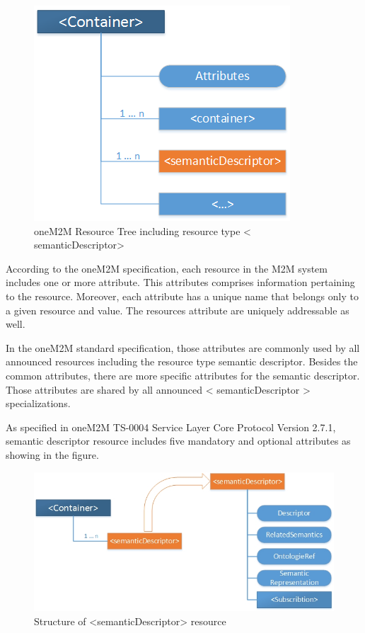 \begin{figure}[htbp]
    \centering
    \includegraphics[width=.5\textwidth]{resources/images/sdresource}
    \caption{oneM2M Resource Tree including resource type < semanticDescriptor> }\label{fig:contrib1:goal}
\end{figure}

According to the oneM2M specification, each resource in the M2M system includes one or more attribute. This attributes comprises information pertaining to the resource. Moreover, each attribute has a unique name that belongs only to a given resource and value. The resources attribute are uniquely addressable as well.\par  %
In the oneM2M standard specification, those attributes are commonly used by all announced resources including the resource type semantic descriptor. Besides the common attributes, there are more specific attributes for the semantic descriptor. Those attributes are shared by all announced < semanticDescriptor > specializations.\par
As specified in oneM2M TS-0004 Service Layer Core Protocol Version 2.7.1, semantic descriptor resource includes five mandatory and optional attributes as showing in the figure.
\begin{figure}[htbp]
    \centering
    \includegraphics[width=1\textwidth]{resources/images/sdattribute}
    \caption{Structure of <semanticDescriptor> resource }\label{fig:contrib1:goal}
\end{figure}
